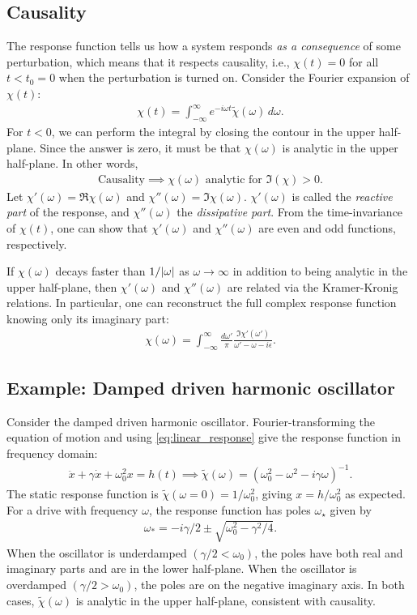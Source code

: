 \documentclass[reprint,
nofootinbib,
amsmath,amssymb,
aps]{revtex4-1}
\newcommand{\f}[2]{\frac{#1}{#2}}
\begin{document}
\subsection{Causality}
The response function tells us how a system responds \textit{as a consequence} of some perturbation, which means that it respects causality, i.e., $\chi(t) = 0$ for all $t < t_0 = 0$ when the perturbation is turned on. Consider the Fourier expansion of $\chi(t)$:
\begin{align*}
\chi(t) = \int_{-\infty}^\infty  e^{-i\omega t } \tilde{\chi}(\omega) \,d\omega.
\end{align*}
For $t<0$, we can perform the integral by closing the contour in the upper half-plane. Since the answer is zero, it must be that $\chi(\omega)$ is analytic in the upper half-plane. In other words, 
\begin{align*}
\text{Causality} \implies \chi(\omega) \text{ analytic for } \Im(\chi) > 0.
\end{align*}
Let $\chi'(\omega) = \Re \chi(\omega)$ and $\chi''(\omega) = \Im \chi(\omega)$. $\chi'(\omega)$ is called the \textit{reactive part} of the response, and $\chi''(\omega)$ the \textit{dissipative part}. From the time-invariance of $\chi(t)$, one can show that $\chi'(\omega)$ and $\chi''(\omega)$ are even and odd functions, respectively.


If $\chi(\omega)$ decays faster than $1/\abs{\omega}$ as $\omega \to \infty$ in addition to being analytic in the upper half-plane, then $\chi'(\omega)$ and $\chi''(\omega)$ are related via the Kramer-Kronig relations. In particular, one can reconstruct the full complex response function knowing only its imaginary part:
\begin{align*}
\chi(\omega) = \int_{-\infty}^\infty \f{d\omega'}{\pi} \f{\Im \chi'(\omega')}{\omega' - \omega - i\epsilon}.
\end{align*}

%
\subsection{Example: Damped driven harmonic oscillator}
Consider the damped driven harmonic oscillator. Fourier-transforming the equation of motion and using  \eqref{eq:linear_response} give the response function in frequency domain:
\begin{align*}
\ddot{x} + \gamma \dot{x} + \omega_0^2 x = h(t) \implies 
\tilde{\chi}(\omega) = ( \omega_0^2 - \omega^2 - i \gamma \omega)^{-1}.
\end{align*}
The static response function is $\tilde{\chi}(\omega = 0) = 1/\omega_0^2$, giving $x = h/\omega_0^2$ as expected. For a drive with frequency $\omega$, the response function has poles $\omega_\star$ given by 
\begin{align*}
\omega_* = -i\gamma/2 \pm \sqrt{\omega_0^2  - \gamma^2/4}.
\end{align*}
When the oscillator is underdamped $(\gamma/2 < \omega_0)$, the poles have both real and imaginary parts and are in the lower half-plane. When the oscillator is overdamped $(\gamma/2 > \omega_0)$, the poles are on the negative imaginary axis. In both cases, $\tilde{\chi}(\omega)$ is analytic in the upper half-plane, consistent with causality. 
\end{document}
